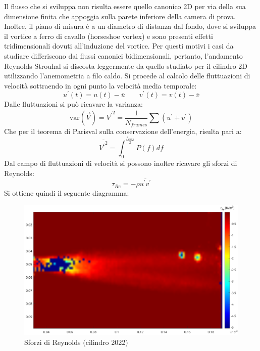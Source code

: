 \noindent Il flusso che si sviluppa non risulta essere quello canonico 2D per via della sua dimensione finita che appoggia sulla parete inferiore della camera di prova. Inoltre, il piano di misura è a un diametro di distanza dal fondo, dove si sviluppa il vortice a ferro di cavallo (horseshoe vortex) e sono presenti effetti tridimensionali dovuti all'induzione del vortice. Per questi motivi i casi da studiare differiscono dai flussi canonici bidimensionali, pertanto, l'andamento Reynolds-Strouhal si discosta leggermente da quello studiato per il cilindro 2D utilizzando l'anemometria a filo caldo.
\newpage
\noindent Si procede al calcolo delle fluttuazioni di velocità sottraendo in ogni punto la velocità media temporale:
\begin{equation*}
    u^\prime(t) = u(t) - \overline u \qquad v^\prime(t) = v(t) - \overline v  
\end{equation*}
Dalle fluttuazioni si può ricavare la varianza:
\begin{equation*}
    \text{var}(\vec V) = \overline{{V^\prime}^2} = \frac 1{N_{frames}} \sum (u^\prime + v^\prime)
\end{equation*}
Che per il teorema di Parisval sulla conservazione dell'energia, risulta pari a:
\begin{equation*}
    \overline{{V^\prime}^2} = \int_0^{\frac{f_{samp}}2} P(f) df
\end{equation*}
Dal campo di fluttuazioni di velocità si possono inoltre ricavare gli sforzi di Reynolds:
\begin{equation*}
    \tau_{Re} = -\rho \overline{u^\prime v^\prime}
\end{equation*}
Si ottiene quindi il seguente diagramma:
\begin{figure}[H]
    \centering
    \includegraphics[width=\textwidth]{images/11/tauRe.png}
    \caption{Sforzi di Reynolds (cilindro 2022)}
\end{figure}